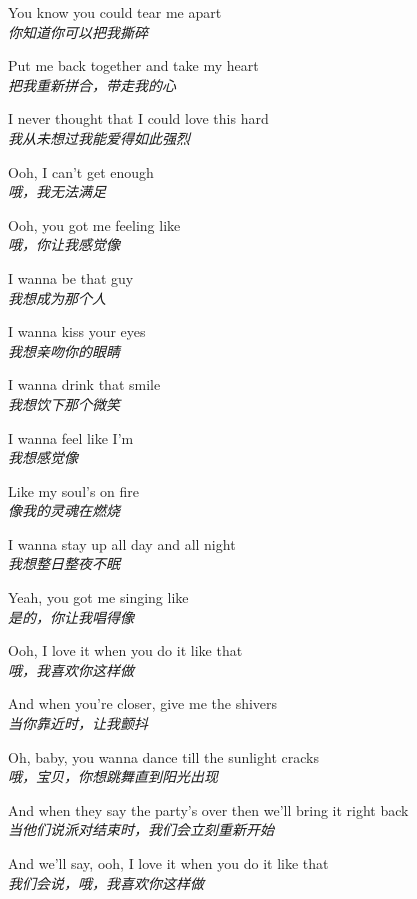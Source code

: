 \begin{spacing}{1.5}
\begin{flushleft}
You know you could tear me apart\\
\textit{你知道你可以把我撕碎}\lyricspace

Put me back together and take my heart\\
\textit{把我重新拼合，带走我的心}\lyricspace

I never thought that I could love this hard\\
\textit{我从未想过我能爱得如此强烈}\lyricspace

Ooh, I can't get enough\\
\textit{哦，我无法满足}\lyricspace

Ooh, you got me feeling like\\
\textit{哦，你让我感觉像}\lyricspace

I wanna be that guy\\
\textit{我想成为那个人}\lyricspace

I wanna kiss your eyes\\
\textit{我想亲吻你的眼睛}\lyricspace

I wanna drink that smile\\
\textit{我想饮下那个微笑}\lyricspace

I wanna feel like I'm\\
\textit{我想感觉像}\lyricspace

Like my soul's on fire\\
\textit{像我的灵魂在燃烧}\lyricspace

I wanna stay up all day and all night\\
\textit{我想整日整夜不眠}\lyricspace

Yeah, you got me singing like\\
\textit{是的，你让我唱得像}\lyricspace

Ooh, I love it when you do it like that\\
\textit{哦，我喜欢你这样做}\lyricspace

And when you're closer, give me the shivers\\
\textit{当你靠近时，让我颤抖}\lyricspace

Oh, baby, you wanna dance till the sunlight cracks\\
\textit{哦，宝贝，你想跳舞直到阳光出现}\lyricspace

And when they say the party's over then we'll bring it right back\\
\textit{当他们说派对结束时，我们会立刻重新开始}\lyricspace

And we'll say, ooh, I love it when you do it like that\\
\textit{我们会说，哦，我喜欢你这样做}\lyricspace


\end{flushleft}
\end{spacing}
